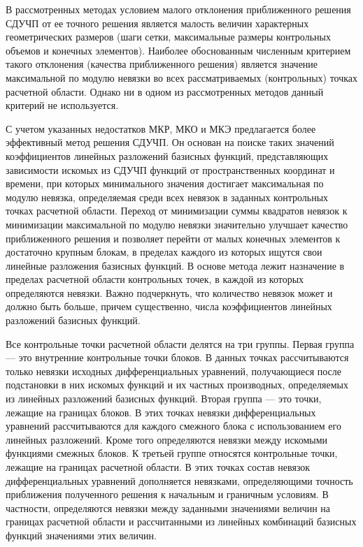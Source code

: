 \documentclass[a4paper,12pt]{article}
\begin{document}
В рассмотренных методах условием малого отклонения приближенного решения
СДУЧП от ее точного решения является малость величин характерных
геометрических размеров (шаги сетки, максимальные размеры контрольных
объемов и конечных элементов). Наиболее обоснованным численным критерием
такого отклонения (качества приближенного решения) является значение
максимальной по модулю невязки во всех рассматриваемых (контрольных) точках
расчетной области. Однако ни в одном из рассмотренных методов данный
критерий не используется. 

С учетом указанных недостатков МКР, МКО и МКЭ предлагается более
эффективный метод решения СДУЧП. Он основан на поиске таких значений
коэффициентов линейных разложений базисных функций, представляющих
зависимости искомых из СДУЧП функций от пространственных координат и
времени, при которых минимального значения достигает максимальная по модулю
невязка, определяемая среди всех невязок в заданных контрольных точках
расчетной области. Переход от минимизации суммы квадратов невязок к
минимизации максимальной по модулю невязки значительно улучшает качество
приближенного решения и позволяет перейти от малых конечных элементов к
достаточно крупным блокам, в пределах каждого из которых ищутся свои
линейные разложения базисных функций. В основе метода лежит назначение в
пределах расчетной области контрольных точек, в каждой из которых
определяются невязки. Важно подчеркнуть, что количество невязок может
и должно быть больше, причем существенно, числа коэффициентов линейных
разложений базисных функций.

Все контрольные точки расчетной области делятся на три группы. Первая
группа — это внутренние контрольные точки блоков. В данных точках
рассчитываются только невязки исходных дифференциальных уравнений,
получающиеся после подстановки в них искомых функций и их частных
производных, определяемых из линейных разложений базисных функций. Вторая
группа — это точки, лежащие на границах блоков. В этих точках невязки
дифференциальных уравнений рассчитываются для каждого смежного блока с
использованием его линейных разложений. Кроме того определяются невязки
между искомыми функциями смежных блоков. К третьей группе относятся
контрольные точки, лежащие на границах расчетной области. В этих точках
состав невязок дифференциальных уравнений дополняется невязками,
определяющими точность приближения полученного решения к начальным и
граничным условиям. В частности, определяются невязки между заданными
значениями величин на границах расчетной области и рассчитанными из
линейных комбинаций базисных функций значениями этих величин.
\end{document}
